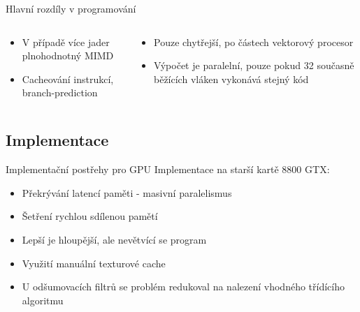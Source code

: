 \documentclass[compress,mathserif]{beamer}
\theoremstyle{definition}
\theoremstyle{plain}
\newcommand{\beI}{\begin{itemize}}
\newcommand{\enI}{\end{itemize}}
\begin{document}
\begin{frame}{Hlavní rozdíly v programování}
    \begin{minipage}{\textwidth}
        \begin{columns}
        \begin{column}{0.4\textwidth}
            \begin{center}
                \beI
                    \item V případě více jader plnohodnotný MIMD
                    \item Cacheování instrukcí, branch-prediction
                \enI
            \end{center}
        \end{column}
        \begin{column}{0.6\textwidth}
            \begin{center}
                \beI
                    \item Pouze chytřejší, po částech vektorový procesor
                    \item Výpočet je paralelní, pouze pokud 32 současně běžících vláken vykonává stejný kód
                \enI
            \end{center}
        \end{column}
        \end{columns}
    \end{minipage}

    \end{frame}

\subsection{Implementace}
    \begin{frame}{Implementační postřehy pro GPU}
      Implementace na starší kartě 8800 GTX:
      \beI
        \item Překrývání latencí paměti - masivní paralelismus
        \item Šetření rychlou sdílenou pamětí
        \item Lepší je hloupější, ale nevětvící se program
        \item Využití manuální texturové cache
        \item U odšumovacích filtrů se problém redukoval na
            nalezení vhodného třídícího algoritmu
      \enI
    \end{frame}
\end{document}
